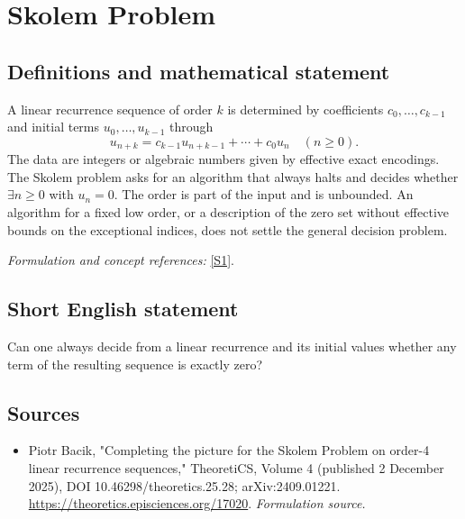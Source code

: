 \documentclass[11pt]{article}
\begin{document}
\section*{\texorpdfstring{Skolem Problem}{Skolem Problem}}\label{1268}
\subsection{Definitions and mathematical statement}
A linear recurrence sequence of order $k$ is determined by coefficients $c_0,\ldots,c_{k-1}$ and initial terms $u_0,\ldots,u_{k-1}$ through
\[
 u_{n+k}=c_{k-1}u_{n+k-1}+\cdots+c_0u_n\quad(n\ge0).
\]
The data are integers or algebraic numbers given by effective exact encodings. The Skolem problem asks for an algorithm that always halts and decides whether $\exists n\ge0$ with $u_n=0$. The order is part of the input and is unbounded. An algorithm for a fixed low order, or a description of the zero set without effective bounds on the exceptional indices, does not settle the general decision problem.
\par\smallskip\textit{Formulation and concept references:} \href{https://theoretics.episciences.org/17020}{[S1]}.

\subsection{Short English statement}
Can one always decide from a linear recurrence and its initial values whether any term of the resulting sequence is exactly zero?
\subsection{Sources}
\begin{itemize}
\item[S1]Piotr Bacik, "Completing the picture for the Skolem Problem on order-4 linear recurrence sequences," TheoretiCS, Volume 4 (published 2 December 2025), DOI 10.46298/theoretics.25.28; arXiv:2409.01221.
\url{https://theoretics.episciences.org/17020}.
\textit{Formulation source.}
\end{itemize}
\end{document}
